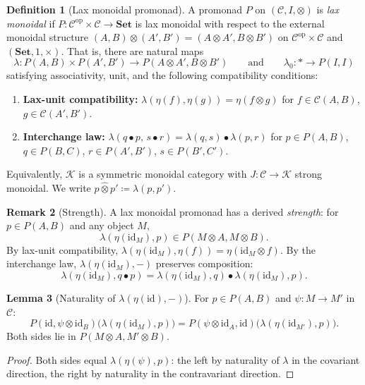 \documentclass[11pt]{article}
\theoremstyle{definition}
\newtheorem{definition}{Definition}[section]
\newtheorem{lemma}[definition]{Lemma}
\newtheorem{remark}[definition]{Remark}
\newcommand{\id}{\mathrm{id}}
\newcommand{\cat}[1]{\mathcal{#1}}
\newcommand{\Cat}[1]{\mathbf{#1}}
\newcommand{\op}{^{\mathrm{op}}}
\newcommand{\smset}{\Cat{Set}}
\newcommand{\qqand}{\qquad\text{and}\qquad}
\begin{document}
\begin{definition}[Lax monoidal promonad]\label{def.monoidal_promonad}
A promonad $P$ on $(\cat{C},I,\otimes)$ is \emph{lax monoidal} if $P\colon\cat{C}\op\times\cat{C}\to\smset$ is lax monoidal with respect to the external monoidal structure $(A,B)\otimes(A',B')=(A\otimes A',B\otimes B')$ on $\cat{C}\op\times\cat{C}$ and $(\smset,1,\times)$. That is, there are natural maps
\[
\lambda\colon P(A,B)\times P(A',B')\to P(A\otimes A',B\otimes B')
\qqand
\lambda_0\colon\ast\to P(I,I)
\]
satisfying associativity, unit, and the following compatibility conditions:
\begin{enumerate}
\item \textbf{Lax-unit compatibility:} $\lambda(\eta(f),\eta(g))=\eta(f\otimes g)$ for $f\in\cat{C}(A,B)$, $g\in\cat{C}(A',B')$.
\item \textbf{Interchange law:} $\lambda(q\bullet p,\,s\bullet r)=\lambda(q,s)\bullet\lambda(p,r)$ for $p\in P(A,B)$, $q\in P(B,C)$, $r\in P(A',B')$, $s\in P(B',C')$.
\end{enumerate}
Equivalently, $\cat{K}$ is a symmetric monoidal category with $J\colon\cat{C}\to\cat{K}$ strong monoidal. We write $p\mathbin{\hat\otimes} p'\coloneqq\lambda(p,p')$.
\end{definition}

\begin{remark}[Strength]\label{rmk.tambara}
A lax monoidal promonad has a derived \emph{strength}: for $p\in P(A,B)$ and any object $M$,
\[
\lambda(\eta(\id_M),p)\in P(M\otimes A,M\otimes B).
\]
By lax-unit compatibility, $\lambda(\eta(\id_M),\eta(f))=\eta(\id_M\otimes f)$. By the interchange law, $\lambda(\eta(\id_M),-)$ preserves composition:
\begin{equation}\label{eqn.tambara_compose}
\lambda(\eta(\id_M),q\bullet p)=\lambda(\eta(\id_M),q)\bullet\lambda(\eta(\id_M),p).
\end{equation}
\end{remark}

\begin{lemma}[Naturality of $\lambda(\eta(\id),-)$]\label{lem.tambara_nat}
For $p\in P(A,B)$ and $\psi\colon M\to M'$ in $\cat{C}$:
\begin{equation}\label{eqn.tambara_nat}
P(\id,\psi\otimes\id_B)\bigl(\lambda(\eta(\id_M),p)\bigr)=P(\psi\otimes\id_A,\id)\bigl(\lambda(\eta(\id_{M'}),p)\bigr).
\end{equation}
Both sides lie in $P(M\otimes A,M'\otimes B)$.
\end{lemma}
\begin{proof}
Both sides equal $\lambda(\eta(\psi),p)$: the left by naturality of $\lambda$ in the covariant direction, the right by naturality in the contravariant direction.
\end{proof}
\end{document}
